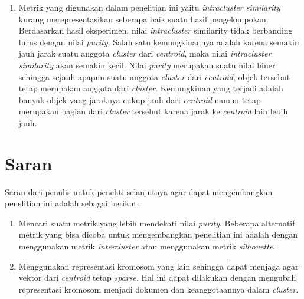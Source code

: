 \begin{enumerate}
	\item Metrik yang digunakan dalam penelitian ini yaitu \textit{intracluster similarity} kurang merepresentasikan seberapa baik suatu hasil pengelompokan. Berdasarkan hasil eksperimen, nilai \textit{intracluster} similarity tidak berbanding lurus dengan nilai \textit{purity}. Salah satu kemungkinannya adalah karena semakin jauh jarak suatu anggota \textit{cluster} dari \textit{centroid}, maka nilai \textit{intracluster similarity} akan semakin kecil. Nilai \textit{purity} merupakan suatu nilai biner sehingga sejauh apapun suatu anggota \textit{cluster} dari \textit{centroid}, objek tersebut tetap merupakan anggota dari \textit{cluster}. Kemungkinan yang terjadi adalah banyak objek yang jaraknya cukup jauh dari \textit{centroid} namun tetap merupakan bagian dari \textit{cluster} tersebut karena jarak ke \textit{centroid} lain lebih jauh.
\end{enumerate}

\section{Saran}
Saran dari penulis untuk peneliti selanjutnya agar dapat mengembangkan penelitian ini adalah sebagai berikut:

\begin{enumerate}
	\item Mencari suatu metrik yang lebih mendekati nilai \textit{purity}. Beberapa alternatif metrik yang bisa dicoba untuk mengembangkan penelitian ini adalah dengan menggunakan metrik \textit{intercluster} atau menggunakan metrik \textit{silhouette}.
	\item Menggunakan representasi kromosom yang lain sehingga dapat menjaga agar vektor dari \textit{centroid} tetap \textit{sparse}. Hal ini dapat dilakukan dengan mengubah representasi kromosom menjadi dokumen dan keanggotaannya dalam \textit{cluster}.
\end{enumerate}